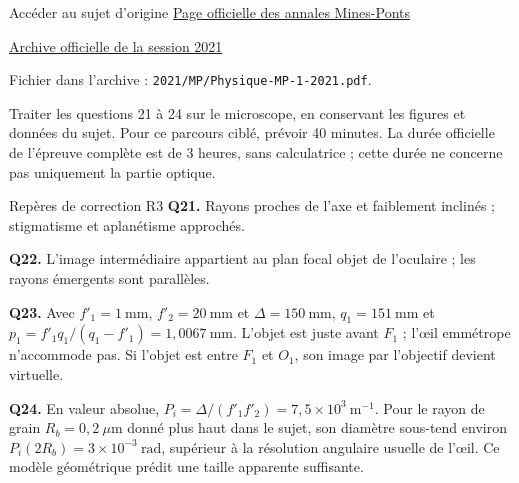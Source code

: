 \begin{loi}{Accéder au sujet d'origine}
\href{https://concoursminesponts.fr/annales/}{Page officielle des annales Mines-Ponts}\par
\href{https://wordpress.concoursminesponts.fr/wp-content/uploads/2024/07/2021.zip}{Archive officielle de la session 2021}\par
Fichier dans l'archive : \texttt{2021/MP/Physique-MP-1-2021.pdf}.
\end{loi}
Traiter les questions 21 à 24 sur le microscope, en conservant les figures et données du sujet. Pour ce parcours ciblé, prévoir 40 minutes. La durée officielle de l'épreuve complète est de 3 heures, sans calculatrice ; cette durée ne concerne pas uniquement la partie optique.
\begin{docu}{Repères de correction R3}
\textbf{Q21.} Rayons proches de l'axe et faiblement inclinés ; stigmatisme et aplanétisme approchés.\par
\textbf{Q22.} L'image intermédiaire appartient au plan focal objet de l'oculaire ; les rayons émergents sont parallèles.\par
\textbf{Q23.} Avec $f'_1=1\ \mathrm{mm}$, $f'_2=20\ \mathrm{mm}$ et $\Delta=150\ \mathrm{mm}$, $q_1=151\ \mathrm{mm}$ et $p_1=f'_1q_1/(q_1-f'_1)=1{,}0067\ \mathrm{mm}$. L'objet est juste avant $F_1$ ; l'œil emmétrope n'accommode pas. Si l'objet est entre $F_1$ et $O_1$, son image par l'objectif devient virtuelle.\par
\textbf{Q24.} En valeur absolue, $P_i=\Delta/(f'_1f'_2)=7{,}5\times10^3\ \mathrm{m^{-1}}$. Pour le rayon de grain $R_b=0{,}2\ \mu\mathrm{m}$ donné plus haut dans le sujet, son diamètre sous-tend environ $P_i(2R_b)=3\times10^{-3}\ \mathrm{rad}$, supérieur à la résolution angulaire usuelle de l'œil. Ce modèle géométrique prédit une taille apparente suffisante.
\end{docu}

